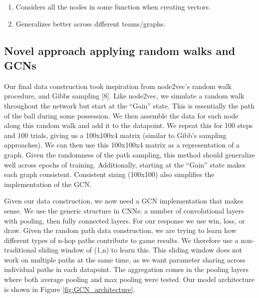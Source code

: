 \begin{enumerate}
    \item Considers all the nodes in some function when creating vectors.

    \item Generalizes better across different teams/graphs. 
\end{enumerate}

\subsection{Novel approach applying random walks and GCNs}
Our final data construction took inspiration from node2vec's random walk procedure, and Gibbs sampling [8]. Like node2vec, we simulate a random walk throughout the network but start at the ``Gain'' state. This is essentially the path of the ball during some possession.  We then assemble the data for each node along this random walk and add it to the datapoint. We repeat this for 100 steps and 100 trials, giving us a 100x100x4 matrix (similar to Gibb's sampling approaches). We can then use this 100x100x4 matrix as a representation of a graph. Given the randomness of the path sampling, this method should generalize well across epochs of training. Additionally, starting at the ``Gain'' state makes each graph consistent. Consistent sizing (100x100) also simplifies the implementation of the GCN. 

Given our data construction, we now need a GCN implementation that makes sense. We use the generic structure in CNNs: a number of convolutional layers with pooling, then fully connected layers. For our response we use win, loss, or draw. Given the random path data construction, we are trying to learn how different types of n-hop paths contribute to game results. We therefore use a non-traditional sliding window of (1,n) to learn this. This sliding window does not work on multiple paths at the same time, as we want parameter sharing across individual paths in each datapoint. The aggregation comes in the pooling layers where both average pooling and max pooling were tested. Our model architecture is shown in Figure \ref{fig:GCN_architecture}.

